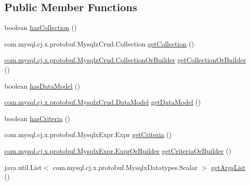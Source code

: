 \subsection*{Public Member Functions}
\begin{DoxyCompactItemize}
\item 
boolean \mbox{\hyperlink{interfacecom_1_1mysql_1_1cj_1_1x_1_1protobuf_1_1_mysqlx_crud_1_1_update_or_builder_a2fc7b64919b0fd9a4133566af4ee8351}{has\+Collection}} ()
\item 
com.\+mysql.\+cj.\+x.\+protobuf.\+Mysqlx\+Crud.\+Collection \mbox{\hyperlink{interfacecom_1_1mysql_1_1cj_1_1x_1_1protobuf_1_1_mysqlx_crud_1_1_update_or_builder_a34ebb136a840af847f843d435fb80b9c}{get\+Collection}} ()
\item 
\mbox{\hyperlink{interfacecom_1_1mysql_1_1cj_1_1x_1_1protobuf_1_1_mysqlx_crud_1_1_collection_or_builder}{com.\+mysql.\+cj.\+x.\+protobuf.\+Mysqlx\+Crud.\+Collection\+Or\+Builder}} \mbox{\hyperlink{interfacecom_1_1mysql_1_1cj_1_1x_1_1protobuf_1_1_mysqlx_crud_1_1_update_or_builder_ab05d759eb6f2464edfd3ab9a9df9414a}{get\+Collection\+Or\+Builder}} ()
\item 
boolean \mbox{\hyperlink{interfacecom_1_1mysql_1_1cj_1_1x_1_1protobuf_1_1_mysqlx_crud_1_1_update_or_builder_ad9aef31c00e8057988e9db8a25a61f1f}{has\+Data\+Model}} ()
\item 
\mbox{\hyperlink{enumcom_1_1mysql_1_1cj_1_1x_1_1protobuf_1_1_mysqlx_crud_1_1_data_model}{com.\+mysql.\+cj.\+x.\+protobuf.\+Mysqlx\+Crud.\+Data\+Model}} \mbox{\hyperlink{interfacecom_1_1mysql_1_1cj_1_1x_1_1protobuf_1_1_mysqlx_crud_1_1_update_or_builder_ae00c70a34d2bd7d960259521b71c81e0}{get\+Data\+Model}} ()
\item 
boolean \mbox{\hyperlink{interfacecom_1_1mysql_1_1cj_1_1x_1_1protobuf_1_1_mysqlx_crud_1_1_update_or_builder_a35e810457e6e06ac00c38fc3beccd6df}{has\+Criteria}} ()
\item 
com.\+mysql.\+cj.\+x.\+protobuf.\+Mysqlx\+Expr.\+Expr \mbox{\hyperlink{interfacecom_1_1mysql_1_1cj_1_1x_1_1protobuf_1_1_mysqlx_crud_1_1_update_or_builder_a459ba27e6320d9a9de383a3ffbc2fe78}{get\+Criteria}} ()
\item 
\mbox{\hyperlink{interfacecom_1_1mysql_1_1cj_1_1x_1_1protobuf_1_1_mysqlx_expr_1_1_expr_or_builder}{com.\+mysql.\+cj.\+x.\+protobuf.\+Mysqlx\+Expr.\+Expr\+Or\+Builder}} \mbox{\hyperlink{interfacecom_1_1mysql_1_1cj_1_1x_1_1protobuf_1_1_mysqlx_crud_1_1_update_or_builder_ad5180f9298dc49568654a0c1ecf8de34}{get\+Criteria\+Or\+Builder}} ()
\item 
java.\+util.\+List$<$ com.\+mysql.\+cj.\+x.\+protobuf.\+Mysqlx\+Datatypes.\+Scalar $>$ \mbox{\hyperlink{interfacecom_1_1mysql_1_1cj_1_1x_1_1protobuf_1_1_mysqlx_crud_1_1_update_or_builder_a6ba9bd1ed5d662dcd23978d52a5fd771}{get\+Args\+List}} ()

\end{DoxyCompactItemize}
